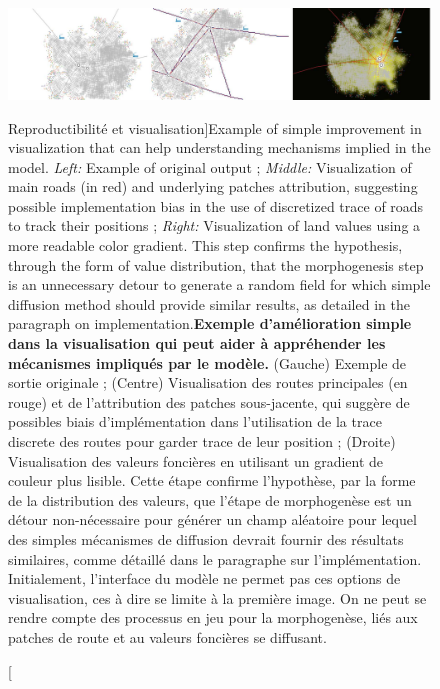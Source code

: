 \begin{figure}
\includegraphics[width=\linewidth]{Figures/Final/3-1-3-fig-reproducibility-tijuana.jpg}
\caption[Reproducibility and visualization][Reproductibilité et visualisation]{Example of simple improvement in visualization that can help understanding mechanisms implied in the model. \textit{Left: } Example of original output ; \textit{Middle: } Visualization of main roads (in red) and underlying patches attribution, suggesting possible implementation bias in the use of discretized trace of roads to track their positions ; \textit{Right: }Visualization of land values using a more readable color gradient. This step confirms the hypothesis, through the form of value distribution, that the morphogenesis step is an unnecessary detour to generate a random field for which simple diffusion method should provide similar results, as detailed in the paragraph on implementation.\label{fig:reproducibility:tijuana}}{\textbf{Exemple d'amélioration simple dans la visualisation qui peut aider à appréhender les mécanismes impliqués par le modèle.} (Gauche) Exemple de sortie originale ; (Centre) Visualisation des routes principales (en rouge) et de l'attribution des patches sous-jacente, qui suggère de possibles biais d'implémentation dans l'utilisation de la trace discrete des routes pour garder trace de leur position ; (Droite) Visualisation des valeurs foncières en utilisant un gradient de couleur plus lisible. Cette étape confirme l'hypothèse, par la forme de la distribution des valeurs, que l'étape de morphogenèse est un détour non-nécessaire pour générer un champ aléatoire pour lequel des simples mécanismes de diffusion devrait fournir des résultats similaires, comme détaillé dans le paragraphe sur l'implémentation. Initialement, l'interface du modèle ne permet pas ces options de visualisation, ces à dire se limite à la première image. On ne peut se rendre compte des processus en jeu pour la morphogenèse, liés aux patches de route et au valeurs foncières se diffusant.\label{fig:reproducibility:tijuana}}
\end{figure}



